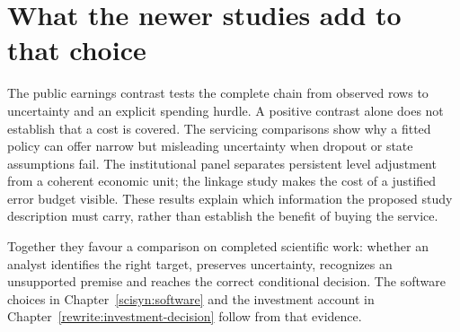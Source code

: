 \section{What the newer studies add to that choice}
The public earnings contrast tests the complete chain from observed rows to
uncertainty and an explicit spending hurdle. A positive contrast alone does
not establish that a cost is covered. The servicing comparisons show why a
fitted policy can offer narrow but misleading uncertainty when dropout or
state assumptions fail. The institutional panel separates persistent level
adjustment from a coherent economic unit; the linkage study makes the cost
of a justified error budget visible. These results explain which information
the proposed study description must carry, rather than establish the benefit
of buying the service.

Together they favour a comparison on completed scientific work: whether an
analyst identifies the right target, preserves uncertainty, recognizes an
unsupported premise and reaches the correct conditional decision. The
software choices in Chapter~\ref{scisyn:software} and the investment account
in Chapter~\ref{rewrite:investment-decision} follow from that evidence.
